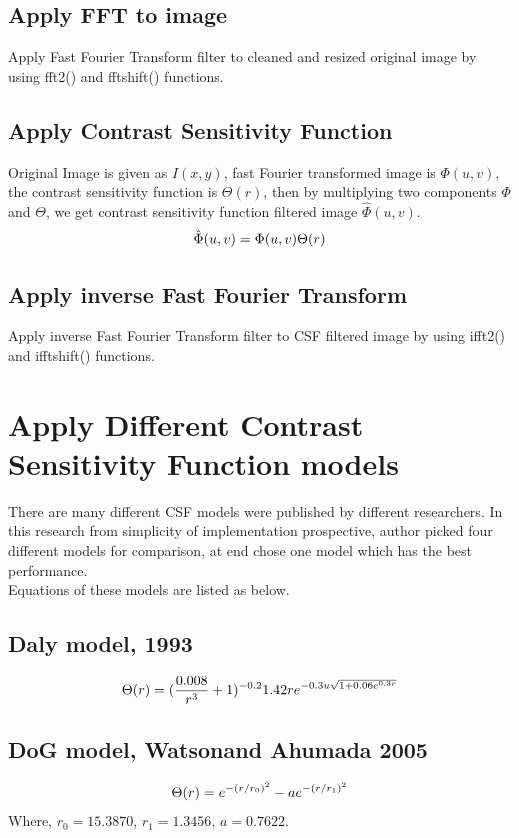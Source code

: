 \documentclass{article}
\begin{document}
\subsection{Apply FFT to image}
Apply Fast Fourier Transform filter to cleaned and resized original image by using fft2() and fftshift() functions.

\subsection{Apply Contrast Sensitivity Function}
Original Image is given as $I(x,y)$, fast Fourier transformed image is $\Phi(u,v)$, the contrast sensitivity function is $\Theta(r)$, then by multiplying two components $\Phi$ and $\Theta$, we get contrast sensitivity function filtered image $\hat{\Phi}(u,v)$.
\begin{equation}
    \centering
    \label{eq:applyCSF}
    \hat{\Phi}(u,v) = \Phi(u,v)\Theta(r) 
\end{equation}
\subsection{Apply inverse Fast Fourier Transform}
Apply inverse Fast Fourier Transform filter to CSF filtered image by using ifft2() and ifftshift() functions.

\section{Apply Different Contrast Sensitivity Function models}
There are many different CSF models were published by different researchers. In this research from simplicity of implementation prospective, author picked four different models for comparison, at end chose one model which has the best performance.\\
Equations of these models are listed as below.
\subsection{Daly model, 1993\cite{UseCSFinFusedIMage}}
\begin{equation}
    \centering
    \label{eq:daly}
     \Theta(r) = (\frac{0.008}{r^3}+1)^{-0.2}1.42re^{-0.3u\sqrt{1+0.06e^{0.3r}}}
\end{equation}
\subsection{DoG model, Watsonand Ahumada 2005\cite{Standard-Model-Contrast}}
\begin{equation}
    \centering
    \label{eq:DoG}
     \Theta(r) = e^{-(r/r_0)^2}-ae^{-(r/r_1)^2}
\end{equation}
Where, $r_0 = 15.3870$, $r_1 = 1.3456$, $a = 0.7622$.
\end{document}
